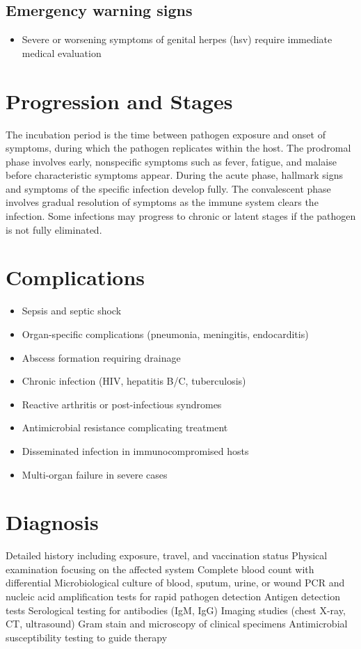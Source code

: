 \subsection{Emergency warning signs}
\begin{itemize}[noitemsep]
  \item Severe or worsening symptoms of genital herpes (hsv) require immediate medical evaluation
\end{itemize}
\section{Progression and Stages}
The incubation period is the time between pathogen exposure and onset of symptoms, during which the pathogen replicates within the host. The prodromal phase involves early, nonspecific symptoms such as fever, fatigue, and malaise before characteristic symptoms appear. During the acute phase, hallmark signs and symptoms of the specific infection develop fully. The convalescent phase involves gradual resolution of symptoms as the immune system clears the infection. Some infections may progress to chronic or latent stages if the pathogen is not fully eliminated.
\section{Complications}
\begin{itemize}[noitemsep]
  \item Sepsis and septic shock
  \item Organ-specific complications (pneumonia, meningitis, endocarditis)
  \item Abscess formation requiring drainage
  \item Chronic infection (HIV, hepatitis B/C, tuberculosis)
  \item Reactive arthritis or post-infectious syndromes
  \item Antimicrobial resistance complicating treatment
  \item Disseminated infection in immunocompromised hosts
  \item Multi-organ failure in severe cases
\end{itemize}
\section{Diagnosis}
Detailed history including exposure, travel, and vaccination status Physical examination focusing on the affected system Complete blood count with differential Microbiological culture of blood, sputum, urine, or wound PCR and nucleic acid amplification tests for rapid pathogen detection Antigen detection tests Serological testing for antibodies (IgM, IgG) Imaging studies (chest X-ray, CT, ultrasound) Gram stain and microscopy of clinical specimens Antimicrobial susceptibility testing to guide therapy

